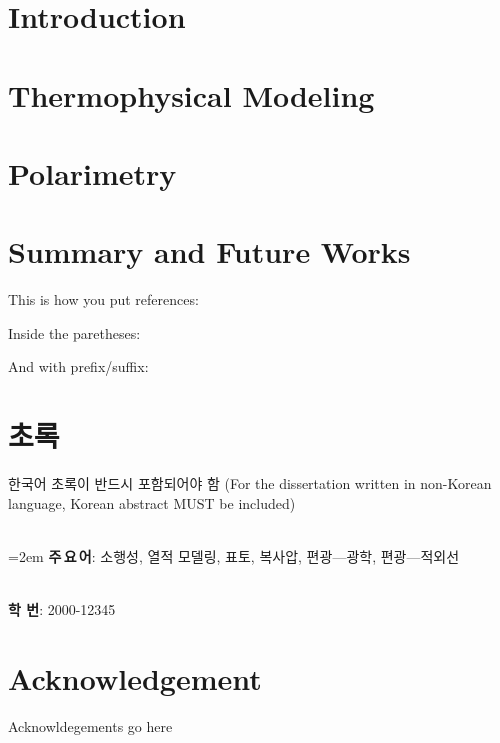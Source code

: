 \documentclass[12pt]{report}
\begin{document}
{
\tableofcontents
\listoffigures{}
\listoftables{}
}

\chapter{Introduction}\label{c:intro}


\chapter{Thermophysical Modeling}\label{c:tpm}



\chapter{Polarimetry}\label{c:pol}
 

\chapter{Summary and Future Works}


This is how you put references:

\cite{1929PhDT.........9L,1970GeCAS...1.2127G,1986MNRAS.218...75G}

Inside the paretheses: \citep{2022_SAG_NICpolpy}

And with prefix/suffix: \citep[prefix!][suffix!]{2018AJ....156..123A}



\clearpage




\chapter*{초록}\setcounter{page}{3}
한국어 초록이 반드시 포함되어야 함 (For the dissertation written in non-Korean language, Korean abstract MUST be included)


~\\
\hangindent=2em
\textbf{주\,요\,어}: 소행성, 열적 모델링, 표토, 복사압, 편광---광학, 편광---적외선

~\\
\noindent \textbf{학 \quad 번}: 2000-12345


\chapter*{Acknowledgement}
Acknowldegements go here
\end{document}
